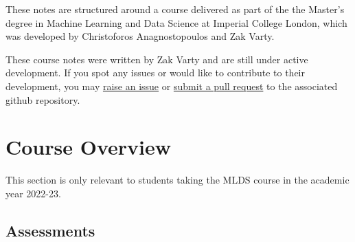 \documentclass[
]{book}
\theoremstyle{definition}
\theoremstyle{definition}
\theoremstyle{definition}
\theoremstyle{definition}
\theoremstyle{remark}
\begin{document}
These notes are structured around a course delivered as part of the the Master's degree in Machine Learning and Data Science at Imperial College London, which was developed by Christoforos Anagnostopoulos and Zak Varty.

These course notes were written by Zak Varty and are still under active development. If you spot any issues or would like to contribute to their development, you may \href{https://github.com/zakvarty/ethics-1/issues}{raise an issue} or \href{https://github.com/zakvarty/ethics-1/pulls}{submit a pull request} to the associated github repository.

\hypertarget{course-overview}{%
\chapter*{Course Overview}\label{course-overview}}

This section is only relevant to students taking the MLDS course in the academic year 2022-23.

\hypertarget{assessments}{%
\section{Assessments}\label{assessments}}
\end{document}

